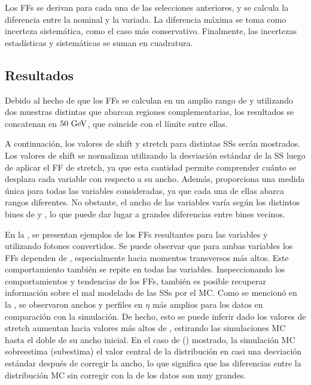 Los \acp{FF} se derivan para cada una de las selecciones anteriores, y se calcula la diferencia entre la nominal y la variada. La diferencia máxima se toma como incerteza sistemática, como el caso más conservativo. Finalmente, las incertezas estad\'isticas y sistem\'aticas se suman en cuadratura.










\subsection{Resultados}
\label{subsec:ss_corrections:ffs:results}


Debido al hecho de que los \acp{FF} se calculan en un amplio rango de \pt y utilizando dos muestras distintas que abarcan regiones complementarias, los resultados se concatenan en \(50~\text{GeV}\), que coincide con el l\'imite entre ellas.

A continuación, los valores de shift y stretch para distintas \acp{SS} ser\'an mostrados. Los valores de shift se normalizan utilizando la desviaci\'on est\'andar de la \ac{SS} luego de aplicar el \ac{FF} de stretch, ya que esta cantidad permite comprender cuánto se desplaza cada variable con respecto a su ancho. Además, proporciona una medida única para todas las variables consideradas, ya que cada una de ellas abarca rangos diferentes. No obstante, el ancho de las variables varía según los distintos bines de \pt y \abseta, lo que puede dar lugar a grandes diferencias entre bines vecinos.

En la \Fig{\ref{fig:ss_corrections:ffs:reslts:ffs}}, se presentan ejemplos de los \acp{FF} resultantes para las variables \reta y \weta utilizando fotones convertidos. Se puede observar que para ambas variables los \acp{FF} dependen de \pt, especialmente hacia momentos transversos más altos. Este comportamiento también se repite en todas las variables.
Inspeccionando los comportamientos y tendencias de los \acp{FF}, también es posible recuperar información sobre el mal modelado de las \acp{SS} por el \ac{MC}. Como se mencion\'o en la \Sect{\ref{sec:pid_ss:ss_differences}}, se observaron anchos y perfiles en \(\eta\) más amplios para los datos en comparación con la simulación. De hecho, esto se puede inferir dado los valores de stretch aumentan hacia valores más altos de \pt, estirando las simulaciones \ac{MC} hasta el doble de su ancho inicial. En el caso de \reta (\weta) mostrado, la simulación \ac{MC} sobreestima (subestima) el valor central de la distribuci\'on en casi una desviación estándar después de corregir la ancho, lo que significa que las diferencias entre la distribución \ac{MC} sin corregir con la de los datos son muy grandes.

